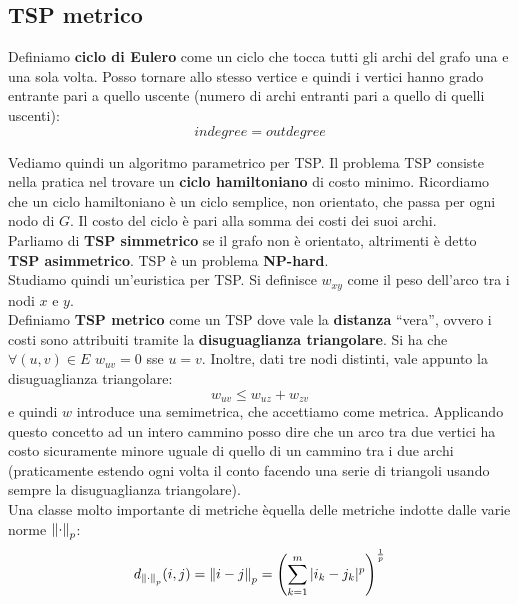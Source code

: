 														\subsection{TSP metrico}
														\begin{definizione}
															Definiamo \textbf{ciclo di Eulero} come un ciclo che tocca tutti gli archi
															del grafo una e una sola volta. Posso tornare allo stesso vertice e quindi i
															vertici hanno grado entrante pari a quello uscente (numero di archi entranti
															pari a quello di quelli uscenti):
															\[indegree=outdegree\]
														\end{definizione}
														Vediamo quindi un algoritmo parametrico per TSP. Il problema TSP consiste nella
														pratica nel trovare un \textbf{ciclo hamiltoniano} di costo minimo. Ricordiamo
														che un ciclo hamiltoniano è un ciclo semplice, non orientato, che passa per ogni
														nodo di $G$. Il costo del ciclo è pari alla somma dei costi dei suoi archi.\\ 
														Parliamo di \textbf{TSP simmetrico} se il grafo non è orientato, altrimenti è
														detto \textbf{TSP asimmetrico}. TSP è un problema \textbf{NP-hard}.\\
														Studiamo quindi un'euristica per TSP. Si definisce $w_{xy}$ come il peso
														dell'arco tra i nodi $x$ e $y$.\\
														Definiamo \textbf{TSP metrico} come un TSP dove vale la \textbf{distanza}
														``vera'', ovvero i costi sono attribuiti tramite la \textbf{disuguaglianza
															triangolare}. Si ha che $\forall(u,v)\in E$ $w_{uv}=0$ sse $u=v$. Inoltre,
														dati tre nodi distinti, vale appunto la disuguaglianza triangolare:
														\[w_{uv}\leq w_{uz}+w_{zv}\]
														e quindi $w$ introduce una semimetrica, che accettiamo come metrica.
														Applicando questo concetto ad un intero cammino posso dire che un arco tra due
														vertici ha costo sicuramente minore uguale di quello di un cammino tra i due
														archi (praticamente estendo ogni volta il conto facendo una serie di triangoli
														usando sempre la disuguaglianza triangolare).\\
														Una classe molto importante di metriche èquella delle metriche indotte dalle
														varie norme $\norm{\cdot}_p$:
														\[d_{\norm{\cdot}_p}(i,j)=\norm{i-j}_p=\left(\sum_{k=1}^m
															|i_k-j_k|^p\right)^{\frac{1}{p}}\]

